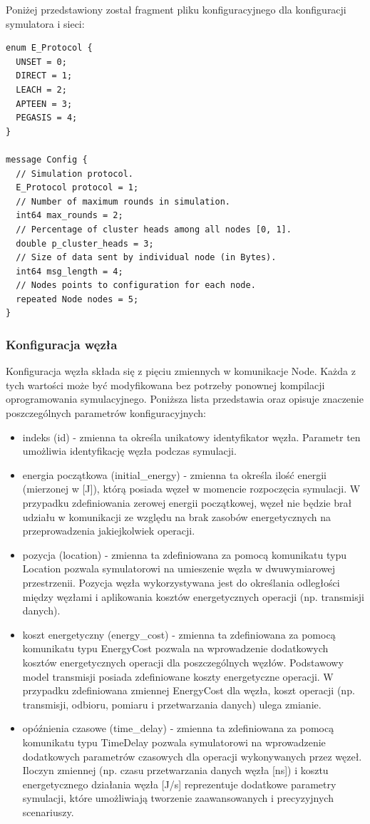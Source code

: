 \documentclass[a4paper,12pt,twoside,openany]{report}
\begin{document}
Poniżej przedstawiony został fragment pliku konfiguracyjnego dla konfiguracji symulatora i sieci:

\begin{lstlisting}
enum E_Protocol {
  UNSET = 0;
  DIRECT = 1;
  LEACH = 2;
  APTEEN = 3;
  PEGASIS = 4;
}

message Config {
  // Simulation protocol.
  E_Protocol protocol = 1;
  // Number of maximum rounds in simulation. 
  int64 max_rounds = 2;
  // Percentage of cluster heads among all nodes [0, 1].
  double p_cluster_heads = 3;
  // Size of data sent by individual node (in Bytes).
  int64 msg_length = 4;
  // Nodes points to configuration for each node.
  repeated Node nodes = 5;
}
\end{lstlisting}

\subsubsection{Konfiguracja węzła}

Konfiguracja węzła składa się z pięciu zmiennych w komunikacje Node. Każda z tych wartości może być modyfikowana bez potrzeby
ponownej kompilacji oprogramowania symulacyjnego. Poniższa lista przedstawia oraz opisuje znaczenie poszczególnych parametrów konfiguracyjnych:

\begin{itemize}
 \item indeks (id) - zmienna ta określa unikatowy identyfikator węzła. Parametr ten umożliwia identyfikację węzła podczas symulacji.
 \item energia początkowa (initial\_energy) - zmienna ta określa ilość energii (mierzonej w [J]), którą posiada węzeł w momencie rozpoczęcia symulacji.
       W przypadku zdefiniowania zerowej energii początkowej, węzeł nie będzie brał udziału w komunikacji ze względu na brak zasobów energetycznych na
       przeprowadzenia jakiejkolwiek operacji.
 \item pozycja (location) - zmienna ta zdefiniowana za pomocą komunikatu typu Location pozwala symulatorowi na umieszenie węzła w dwuwymiarowej przestrzenii.
       Pozycja węzła wykorzystywana jest do określania odległości między węzłami i aplikowania kosztów energetycznych operacji (np. transmisji danych).
 \item koszt energetyczny (energy\_cost) - zmienna ta zdefiniowana za pomocą komunikatu typu EnergyCost pozwala na wprowadzenie dodatkowych kosztów energetycznych
       operacji dla poszczególnych węzłów. Podstawowy model transmisji posiada zdefiniowane koszty energetyczne operacji.
       W przypadku zdefiniowana zmiennej EnergyCost dla węzła, koszt operacji (np. transmisji, odbioru, pomiaru i przetwarzania danych) ulega zmianie.
 \item opóźnienia czasowe (time\_delay) - zmienna ta zdefiniowana za pomocą komunikatu typu TimeDelay pozwala symulatorowi na wprowadzenie dodatkowych parametrów czasowych
       dla operacji wykonywanych przez węzeł. Iloczyn zmiennej (np. czasu przetwarzania danych węzła [ns]) i kosztu energetycznego działania węzła [J/s] 
       reprezentuje dodatkowe parametry symulacji, które umożliwiają tworzenie zaawansowanych i precyzyjnych scenariuszy.
\end{itemize}
\end{document}
